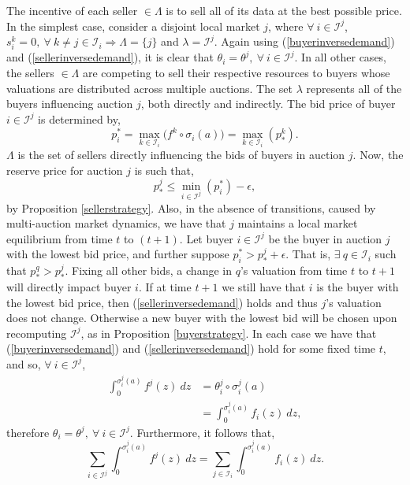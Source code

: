 \documentclass[12pt]{article}
\theoremstyle{definition}
\newcommand{\mcI}{\mathcal{I}}
\newcommand{\g}{\sigma}
\begin{document}
\begin{multicols}{2}
\iffalse
Now, we have,
\begin{equation}\label{rho}
    \rho^j(p_*^j) \le \displaystyle\sum_{i\in\mcI^j} e_i(a(s_i^j)),
\end{equation}
from (\ref{datademand}), (\ref{buyerinversedemand}),
(\ref{sellerinversedemand}), and so $p_i^j \ge p_{*}^j \ge p_i^k, \ \forall \ i \in
[p_i^j]_{i\in\mcI^j}$ and $\forall \ k \in [p_i^k]_{k\in\mcI_i}$
\fi

The incentive of each seller $\in\Lambda$ is to sell all of its data at the
best possible price. In the simplest case,
consider a disjoint local market $j$, where $\forall \ i\in\mcI^j$, $s_i^k = 0,
\ \forall \ k\ne j \in \mcI_i \Rightarrow \Lambda = \lbrace j \rbrace$ and
$\lambda = \mcI^j$. 
Again using (\ref{buyerinversedemand}) and  (\ref{sellerinversedemand}), it is
clear that $\theta_i = \theta^j, \ \forall \ i \in \mcI^j$.
In all other cases, the sellers $\in\Lambda$ are competing to sell
their respective resources to buyers whose valuations are distributed across multiple auctions. 
The set $\lambda$ represents all of the buyers influencing auction $j$, both
directly and indirectly. 
The bid price of buyer $i\in\mcI^j$ is determined by,
\begin{equation}\label{maxbid}
    p_i^* = \max_{k\in\mcI_i}\big(f^k \circ \g_i(a)\big)= \max_{k\in\mcI_i}(p_*^k).
\end{equation}
$\Lambda$ is the set of sellers directly influencing the bids of buyers
in auction $j$. Now, the reserve price for auction $j$ is such that,
\begin{equation}\label{resprice}
    p_*^j \le \min_{i\in\mcI^j}(p_i^*) - \epsilon,
\end{equation}
by Proposition \ref{sellerstrategy}. 
Also, in the absence of transitions, caused by multi-auction market dynamics, we have 
that $j$ maintains a local market
equilibrium from time $t$ to $(t+1)$. Let buyer $i\in\mcI^j$ be the buyer in auction $j$ with the lowest bid price,
and further suppose $p_i^* > p_*^j + \epsilon$. That is, $\exists \ q \in \mcI_i$ such
that $p_*^q > p_*^j$. Fixing all other bids, a change in $q$'s valuation from time $t$ to $t+1$ will
directly impact buyer $i$. If at time $t+1$ we still have that $i$ is the
buyer with the lowest bid price, then (\ref{sellerinversedemand}) holds and
thus $j$'s valuation does not change. Otherwise a new buyer with the lowest bid will be chosen upon
recomputing $\mcI^j$, as in Proposition \ref{buyerstrategy}. 
In each case we
have that (\ref{buyerinversedemand}) and (\ref{sellerinversedemand}) hold for
some fixed time $t$, and so, $\forall \ i \in\mcI^j$,
\begin{align*}
    \int_0^{\g_i^j(a)} f^j(z) \ dz &= \theta_i^j \circ \g_i^j(a)\\
    &= \int_0^{\g_i^j(a)} f_i(z) \ dz,
\end{align*}
therefore $\theta_i = \theta^j, \ \forall \ i \in \mcI^j$.
Furthermore, it follows that,
\begin{equation}\label{jdemand}
    \displaystyle\sum_{i\in\mcI^j}\int_0^{\g_i^j(a)} f^j(z) \ dz =
\sum_{j\in\mcI_i}\int_0^{\g_i^j(a)} f_i(z) \ dz.
\end{equation}


\end{multicols}
\end{document}
